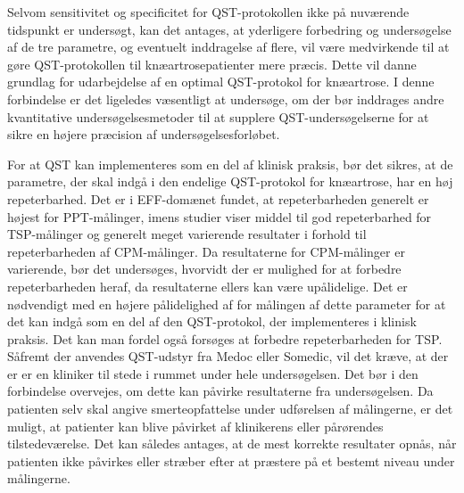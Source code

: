 Selvom sensitivitet og specificitet for QST-protokollen ikke på nuværende tidspunkt er undersøgt, kan det antages, at yderligere forbedring og undersøgelse af de tre parametre, og eventuelt inddragelse af flere, vil være medvirkende til at gøre QST-protokollen til knæartrosepatienter mere præcis. Dette vil danne grundlag for udarbejdelse af en optimal QST-protokol for knæartrose. I denne forbindelse er det ligeledes væsentligt at undersøge, om der bør inddrages andre kvantitative undersøgelsesmetoder til at supplere QST-undersøgelserne for at sikre en højere præcision af undersøgelsesforløbet.


For at QST kan implementeres som en del af klinisk praksis, bør det sikres, at de parametre, der skal indgå i den endelige QST-protokol for knæartrose, har en høj repeterbarhed. Det er i EFF-domænet fundet, at repeterbarheden generelt er højest for PPT-målinger, imens studier viser middel til god repeterbarhed for TSP-målinger og generelt meget varierende resultater i forhold til repeterbarheden af CPM-målinger. Da resultaterne for CPM-målinger er varierende, bør det undersøges, hvorvidt der er mulighed for at forbedre repeterbarheden heraf, da resultaterne ellers kan være upålidelige. Det er nødvendigt med en højere pålidelighed af for målingen af dette parameter for at det kan indgå som en del af den QST-protokol, der implementeres i klinisk praksis. Det kan man fordel også forsøges at forbedre repeterbarheden for TSP.\\ 
Såfremt der anvendes QST-udstyr fra Medoc eller Somedic, vil det kræve, at der er er en kliniker til stede i rummet under hele undersøgelsen. Det bør i den forbindelse overvejes, om dette kan påvirke resultaterne fra undersøgelsen. Da patienten selv skal angive smerteopfattelse under udførelsen af målingerne, er det muligt, at patienter kan blive påvirket af klinikerens eller pårørendes tilstedeværelse. Det kan således antages, at de mest korrekte resultater opnås, når patienten ikke påvirkes eller stræber efter at præstere på et bestemt niveau under målingerne.


